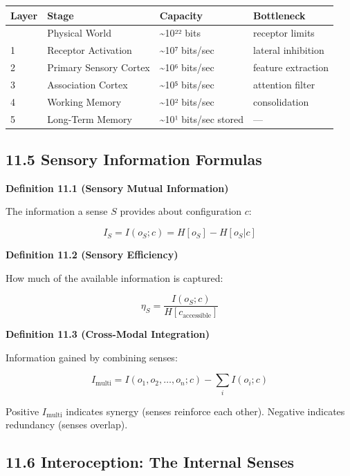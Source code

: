 \documentclass[
  11pt,
  letterpaper,
  twoside,
  openright]{book}
\begin{document}
\begin{longtable}[]{@{}llll@{}}
\toprule\noalign{}
Layer & Stage & Capacity & Bottleneck \\
\midrule\noalign{}
\endhead
\bottomrule\noalign{}
\endlastfoot
0 & Physical World & \textasciitilde10²² bits & receptor limits \\
1 & Receptor Activation & \textasciitilde10⁷ bits/sec & lateral
inhibition \\
2 & Primary Sensory Cortex & \textasciitilde10⁶ bits/sec & feature
extraction \\
3 & Association Cortex & \textasciitilde10⁵ bits/sec & attention
filter \\
4 & Working Memory & \textasciitilde10² bits/sec & consolidation \\
5 & Long-Term Memory & \textasciitilde10¹ bits/sec stored & --- \\
\end{longtable}

\subsection{11.5 Sensory Information
Formulas}\label{sensory-information-formulas}

\textbf{Definition 11.1 (Sensory Mutual Information)}

The information a sense \(S\) provides about configuration \(c\):

\[I_S = I(o_S; c) = H[o_S] - H[o_S | c]\]

\textbf{Definition 11.2 (Sensory Efficiency)}

How much of the available information is captured:

\[\eta_S = \frac{I(o_S; c)}{H[c_{\text{accessible}}]}\]

\textbf{Definition 11.3 (Cross-Modal Integration)}

Information gained by combining senses:

\[I_{\text{multi}} = I(o_1, o_2, \ldots, o_n; c) - \sum_i I(o_i; c)\]

Positive \(I_{\text{multi}}\) indicates synergy (senses reinforce each
other). Negative indicates redundancy (senses overlap).

\subsection{11.6 Interoception: The Internal
Senses}\label{interoception-the-internal-senses}
\end{document}

